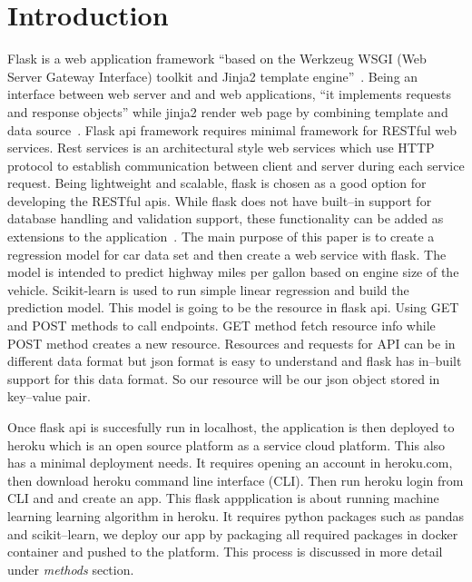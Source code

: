 

\maketitle

\section{Introduction}
Flask is a web application framework ``based on the Werkzeug WSGI (Web Server
Gateway Interface) toolkit and Jinja2 template 
engine''~\cite{hid-sp18-415-flask}. Being an interface between web server
and and web applications, ``it implements requests and response objects'' 
while jinja2 render web page by combining template and data 
source~\cite{hid-sp18-415-www-flask}. 
Flask api framework requires minimal framework for RESTful web services.
Rest services is an architectural style web services which use HTTP protocol
to establish communication between client and server during each service
request.
Being lightweight and scalable, flask is chosen as a good option for 
developing the RESTful apis. While flask does not have built--in support for 
database handling and validation support, these functionality can be added as
extensions to the application~\cite{hid-sp18-415-www-flask}.
The main purpose of this paper is
to create a regression model for car data set and then create a web service
with flask. The model is intended to
predict highway miles per gallon based on engine size of the vehicle.
Scikit-learn is used to run simple linear regression and build the prediction
model. This model is going
to be the resource in flask api. Using GET and POST methods to call
endpoints. GET method fetch resource info while POST method creates
a new resource. Resources and requests for API can be in different data
format but json format
is easy to understand and flask has in--built support for this data format. So 
our resource will be our json object stored in key--value pair.
  
Once flask api is succesfully run in localhost, the application is
then deployed to heroku which is an open source platform as a 
service cloud platform. This also has a minimal deployment needs.
It requires opening an account in heroku.com, then download heroku
command line interface (CLI). Then run heroku login from CLI and
and create an app. This flask appplication is about running machine learning
learning algorithm in heroku. It requires python packages such as pandas and 
scikit--learn, we deploy our app by packaging all required packages in docker
container and pushed to the platform. This process is discussed in more detail 
under \textit{methods} section.
  
